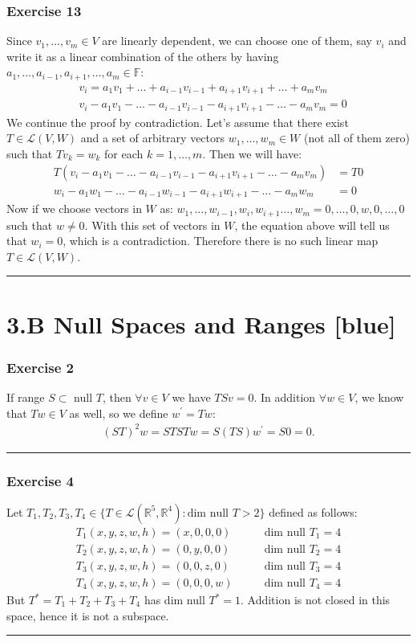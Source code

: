 \documentclass[12pt, letterpaper]{scrartcl}
\newcommand{\R}{\mathbb{R}}
\newcommand{\F}{\mathbb{F}}
\begin{document}
\subsubsection*{Exercise 13}
Since $v_1,\dots, v_m\in V$ are linearly dependent, we can choose one of them, say $v_i$ and write it as a linear combination of the others by having $a_1,\dots,a_{i-1},a_{i+1}, \dots, a_m\in\F$:
\begin{align*}
    &v_i = a_1v_1+\dots+a_{i-1}v_{i-1}+a_{i+1}v_{i+1}+\dots+a_mv_m\\
    &v_i -a_1v_1-\dots-a_{i-1}v_{i-1}-a_{i+1}v_{i+1}-\dots-a_mv_m = 0
\end{align*}
We continue the proof by contradiction. Let's assume that there exist $T\in\mathcal{L}(V,W)$ and a set of arbitrary vectors $w_1,\dots,w_m\in W$ (not all of them zero) such that $Tv_k=w_k$ for each $k=1,\dots,m$. Then we will have:
\begin{align*}
    T(v_i -a_1v_1-\dots-a_{i-1}v_{i-1}-a_{i+1}v_{i+1}-\dots-a_mv_m) &= T0\\
    w_i-a_1w_1-\dots-a_{i-1}w_{i-1}-a_{i+1}w_{i+1}-\dots-a_mw_m&=0
\end{align*}
Now if we choose vectors in $W$ as: $w_1,\dots,w_{i-1},w_i,w_{i+1}\dots,w_m=0,\dots,0,w,0,\dots,0$ such that $w\neq0$. With this set of vectors in $W$, the equation above will tell us that $w_i=0$, which is a contradiction. Therefore there is no such linear map $T\in\mathcal{L}(V,W)$.
\vskip1mm\hrule

\section*{3.B Null Spaces and Ranges \xrfill[2pt]{3pt}[blue]}
\subsubsection*{Exercise 2}
If range $S \subset$ null $T$, then $\forall v\in V$ we have $TSv=0$. In addition $\forall w\in V$, we know that $Tw\in V$ as well, so we define $w^\prime=Tw$:
\begin{align*}
    (ST)^2w=STSTw=S(TS)w^\prime=S0=0.
\end{align*}
\vskip1mm\hrule

\subsubsection*{Exercise 4}
Let $T_1, T_2, T_3, T_4\in \{T\in \mathcal{L}(\R^5, \R^4): \text{dim null }T>2\}$ defined as follows:
\begin{align*}
    T_1(x,y,z,w,h)=(x,0,0,0) &\qquad\text{dim null }T_1 = 4\\
    T_2(x,y,z,w,h)=(0,y,0,0) &\qquad\text{dim null }T_2 = 4\\
    T_3(x,y,z,w,h)=(0,0,z,0) &\qquad\text{dim null }T_3 = 4\\
    T_4(x,y,z,w,h)=(0,0,0,w) &\qquad\text{dim null }T_4 = 4
\end{align*}
But $T^*=T_1+T_2+T_3+T_4$ has dim null $T^*=1$. Addition is not closed in this space, hence it is not a subspace.
\vskip1mm\hrule
\end{document}
